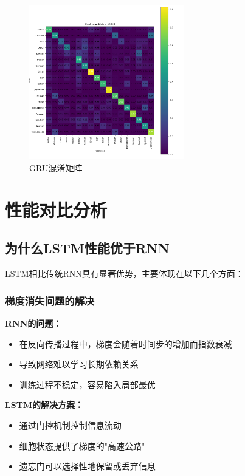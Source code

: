 \documentclass[a4paper]{article}
\begin{document}
\begin{figure}[H]
    \centering
    \includegraphics[width=0.6\textwidth]{confusion_matrix_gru.png}
    \caption{GRU混淆矩阵}
    \label{fig:gru_confusion}
\end{figure}

\section{性能对比分析}
\subsection{为什么LSTM性能优于RNN}

LSTM相比传统RNN具有显著优势，主要体现在以下几个方面：

\subsubsection{梯度消失问题的解决}
\textbf{RNN的问题：}
\begin{itemize}
    \item 在反向传播过程中，梯度会随着时间步的增加而指数衰减
    \item 导致网络难以学习长期依赖关系
    \item 训练过程不稳定，容易陷入局部最优
\end{itemize}

\textbf{LSTM的解决方案：}
\begin{itemize}
    \item 通过门控机制控制信息流动
    \item 细胞状态提供了梯度的"高速公路"
    \item 遗忘门可以选择性地保留或丢弃信息
\end{itemize}
\end{document}
